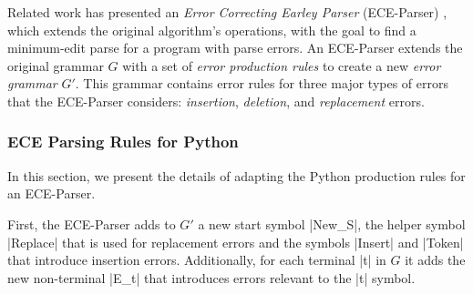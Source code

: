 
%

 Related work has presented an \emph{Error
Correcting Earley Parser} (ECE-Parser) \citep{Aho_1972},
which extends the original algorithm's operations, with the goal to find a
minimum-edit parse for a program with parse errors. An ECE-Parser extends the
original grammar $G$ with a set of \emph{error production rules} to create a new
\emph{error grammar} $G'$. This grammar contains error rules for three major
types of errors that the ECE-Parser considers: \emph{insertion},
\emph{deletion}, and \emph{replacement} errors.

\subsubsection{ECE Parsing Rules for Python}

In this section, we present the details of adapting the Python
production rules for an ECE-Parser.

First, the ECE-Parser adds to $G'$ a new start symbol |New_S|, the helper
symbol |Replace| that is used for replacement errors and the symbols |Insert|
and |Token| that introduce insertion errors. Additionally, for each terminal |t|
in $G$ it adds the new non-terminal |E_t| that introduces errors relevant to the
|t| symbol.


